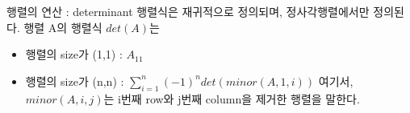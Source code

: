 \documentclass{beamer}
\begin{document}
\begin{frame}{행렬의 연산 : determinant} 
행렬식은 재귀적으로 정의되며, 정사각행렬에서만 정의된다. 행렬 A의 행렬식 $det(A)$는 
\begin{itemize} 
\item 행렬의 size가 (1,1) : $A_{11}$
\item 행렬의 size가 (n,n) : $\sum^{n}_{i=1}(-1)^n det(minor(A, 1, i))$
여기서, $minor(A, i, j)$는 i번째 row와 j번째 column을 제거한 행렬을 말한다. 
\end{itemize}
\end{frame}











\end{document}
